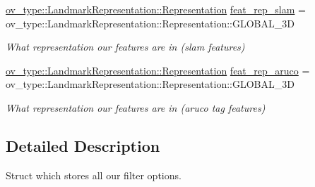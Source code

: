 \begin{DoxyCompactItemize}
\hyperlink{classov__type_1_1LandmarkRepresentation_a7f5783df6932ace7f098ae243b6d298e}{ov\+\_\+type\+::\+Landmark\+Representation\+::\+Representation} \hyperlink{structov__msckf_1_1StateOptions_a426ea4e9c3f5f269eddb356e9e7feb6c}{feat\+\_\+rep\+\_\+slam} = ov\+\_\+type\+::\+Landmark\+Representation\+::\+Representation\+::\+G\+L\+O\+B\+A\+L\+\_\+3D
\begin{DoxyCompactList}\small\item\em What representation our features are in (slam features) \end{DoxyCompactList}\item 
\mbox{\label{structov__msckf_1_1StateOptions_aa2d88cb407257f4f7d3c868e8f39ed6c}} 
\hyperlink{classov__type_1_1LandmarkRepresentation_a7f5783df6932ace7f098ae243b6d298e}{ov\+\_\+type\+::\+Landmark\+Representation\+::\+Representation} \hyperlink{structov__msckf_1_1StateOptions_aa2d88cb407257f4f7d3c868e8f39ed6c}{feat\+\_\+rep\+\_\+aruco} = ov\+\_\+type\+::\+Landmark\+Representation\+::\+Representation\+::\+G\+L\+O\+B\+A\+L\+\_\+3D
\begin{DoxyCompactList}\small\item\em What representation our features are in (aruco tag features) \end{DoxyCompactList}\end{DoxyCompactItemize}


\subsection{Detailed Description}
Struct which stores all our filter options. 